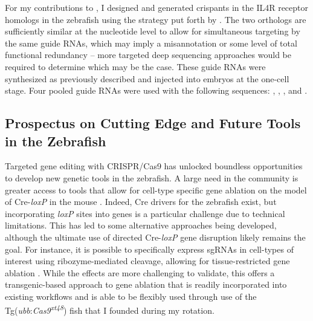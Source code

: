 For my contributions to \citet{Cronan2021}, I designed and generated crispants in the IL4R receptor homologs in the zebrafish using the strategy put forth by \citet{Wu2018}. The two orthologs are sufficiently similar at the nucleotide level to allow for simultaneous targeting by the same guide RNAs, which may imply a misannotation or some level of total functional redundancy -- more targeted deep sequencing approaches would be required to determine which may be the case. These guide RNAs were synthesized as previously described and injected into embryos at the one-cell stage. Four pooled guide RNAs were used with the following sequences: , , , and .

\subsection{Prospectus on Cutting Edge and Future Tools in the Zebrafish}\label{newtech}

Targeted gene editing with CRISPR/Cas9 has unlocked boundless opportunities to develop new genetic tools in the zebrafish. A large need in the community is greater access to tools that allow for cell-type specific gene ablation on the model of Cre-\textit{loxP} in the mouse \citep{Housden2017}. Indeed, Cre drivers for the zebrafish exist, but incorporating \textit{loxP} sites into genes is a particular challenge due to technical limitations. This has led to some alternative approaches being developed, although the ultimate use of directed Cre-\textit{loxP} gene disruption likely remains the goal. For instance, it is possible to specifically express sgRNAs in cell-types of interest using ribozyme-mediated cleavage, allowing for tissue-restricted gene ablation \citep{Wang2021, Yin2015}. While the effects are more challenging to validate, this offers a transgenic-based approach to gene ablation that is readily incorporated into existing workflows and is able to be flexibly used through use of the Tg(\textit{ubb}:\textit{Cas9\textsuperscript{xt48}}) fish that I founded during my rotation. 

